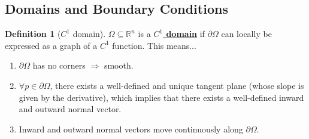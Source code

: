 \documentclass[11pt]{scrartcl}
\theoremstyle{definition}
\newtheorem{definition}{Definition}
\theoremstyle{remark}
\newcommand{\dfn}[1]{\textbf{\underline{#1}}}
\newcommand{\R}[0]{\mathbb{R}}
\begin{document}
\subsection{Domains and Boundary Conditions}

\begin{definition}[$C^1$ domain] 
	$\Omega \subseteq \R^n$ is a \dfn{$C^1$ domain} if $\partial \Omega$ can locally be expressed as a graph of a $C^1$ function. This means...
	\begin{enumerate}[noitemsep]
		\item $\partial \Omega$ has no corners $\Rightarrow$ smooth. 
		\item $\forall p \in \partial \Omega$, there exists a well-defined and unique tangent plane (whose slope is given by the derivative), which implies that there exists a well-defined inward and outward normal vector. 
		\item Inward and outward normal vectors move continuously along $\partial \Omega$. 
	\end{enumerate}
\end{definition}
\end{document}
